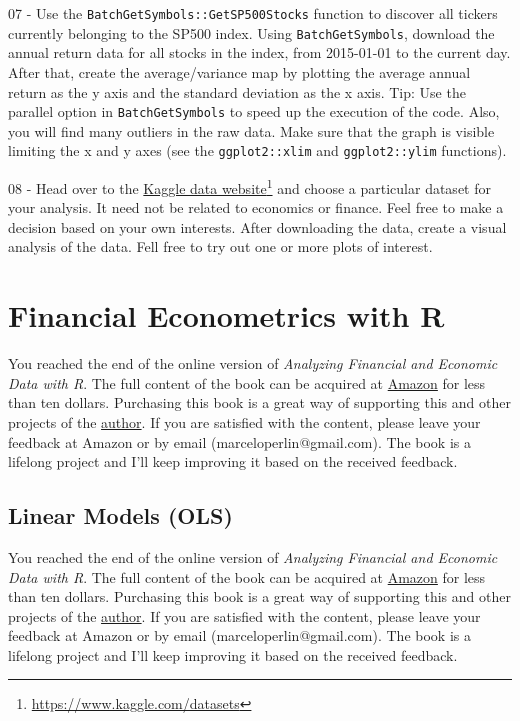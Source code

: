 \documentclass[
  12pt,
]{book}
\newenvironment{pleasebuyit}
{\begin{noteblock}
		
	} {\end{noteblock}}
\begin{document}
07 -
Use the \texttt{BatchGetSymbols::GetSP500Stocks} function to discover all tickers currently belonging to the SP500 index. Using \texttt{BatchGetSymbols}, download the annual return data for all stocks in the index, from 2015-01-01 to the current day. After that, create the average/variance map by plotting the average annual return as the y axis and the standard deviation as the x axis. Tip: Use the parallel option in \texttt{BatchGetSymbols} to speed up the execution of the code. Also, you will find many outliers in the raw data. Make sure that the graph is visible limiting the x and y axes (see the \texttt{ggplot2::xlim} and \texttt{ggplot2::ylim} functions).

08 -
Head over to the \href{https://www.kaggle.com/datasets}{Kaggle data website}\footnote{\url{https://www.kaggle.com/datasets}} and choose a particular dataset for your analysis. It need not be related to economics or finance. Feel free to make a decision based on your own interests. After downloading the data, create a visual analysis of the data. Fell free to try out one or more plots of interest.

\hypertarget{models}{%
\chapter{Financial Econometrics with R}\label{models}}

\begin{pleasebuyit}
You reached the end of the online version of \emph{Analyzing Financial
and Economic Data with R}. The full content of the book can be acquired
at \href{https://www.amazon.com/dp/B084LSNXMN}{Amazon} for less than ten
dollars. Purchasing this book is a great way of supporting this and
other projects of the \href{https://www.msperlin.com/}{author}. If you
are satisfied with the content, please leave your feedback at Amazon or
by email (marceloperlin@gmail.com). The book is a lifelong project and
I'll keep improving it based on the received feedback.
\end{pleasebuyit}

\hypertarget{linear-models}{%
\section{Linear Models (OLS)}\label{linear-models}}

\begin{pleasebuyit}
You reached the end of the online version of \emph{Analyzing Financial
and Economic Data with R}. The full content of the book can be acquired
at \href{https://www.amazon.com/dp/B084LSNXMN}{Amazon} for less than ten
dollars. Purchasing this book is a great way of supporting this and
other projects of the \href{https://www.msperlin.com/}{author}. If you
are satisfied with the content, please leave your feedback at Amazon or
by email (marceloperlin@gmail.com). The book is a lifelong project and
I'll keep improving it based on the received feedback.
\end{pleasebuyit}
\end{document}

